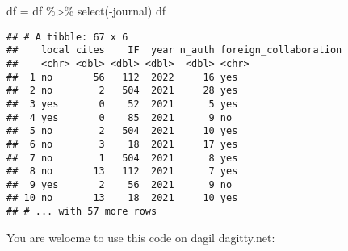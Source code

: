 \documentclass[
]{article}
\newenvironment{Shaded}{\begin{snugshade}}{\end{snugshade}}
\newcommand{\FunctionTok}[1]{\textcolor[rgb]{0.00,0.00,0.00}{#1}}
\newcommand{\NormalTok}[1]{#1}
\newcommand{\OtherTok}[1]{\textcolor[rgb]{0.56,0.35,0.01}{#1}}
\newcommand{\SpecialCharTok}[1]{\textcolor[rgb]{0.00,0.00,0.00}{#1}}
\begin{document}
\begin{Shaded}
\begin{Highlighting}[]
\NormalTok{df }\OtherTok{=}\NormalTok{ df }\SpecialCharTok{\%\textgreater{}\%} \FunctionTok{select}\NormalTok{(}\SpecialCharTok{{-}}\NormalTok{journal)}
\NormalTok{df}
\end{Highlighting}
\end{Shaded}

\begin{verbatim}
## # A tibble: 67 x 6
##    local cites    IF  year n_auth foreign_collaboration
##    <chr> <dbl> <dbl> <dbl>  <dbl> <chr>                
##  1 no       56   112  2022     16 yes                  
##  2 no        2   504  2021     28 yes                  
##  3 yes       0    52  2021      5 yes                  
##  4 yes       0    85  2021      9 no                   
##  5 no        2   504  2021     10 yes                  
##  6 no        3    18  2021     17 yes                  
##  7 no        1   504  2021      8 yes                  
##  8 no       13   112  2021      7 yes                  
##  9 yes       2    56  2021      9 no                   
## 10 no       13    18  2021     10 yes                  
## # ... with 57 more rows
\end{verbatim}

You are welocme to use this code on dagil dagitty.net:
\end{document}
